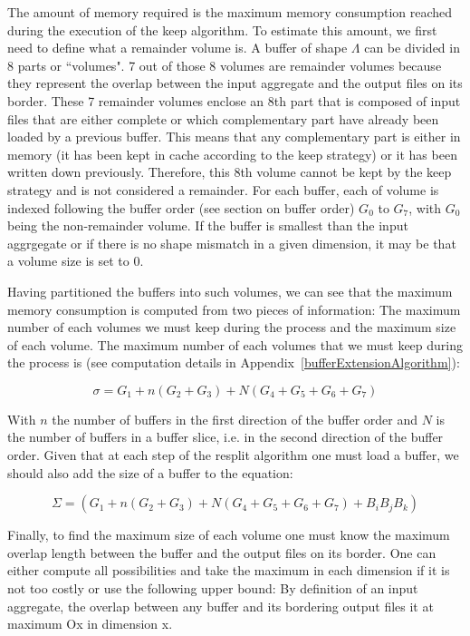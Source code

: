 \documentclass[conference]{IEEEtran}
\begin{document}
The amount of memory required is the maximum memory consumption reached during
the execution of the keep algorithm. To estimate this amount, we first need to
define what a remainder volume is. A buffer of shape $\Lambda$ can be divided in
8 parts or ``volumes". 7 out of those 8 volumes are remainder volumes because
they represent the overlap between the input aggregate and the output files on
its border. These 7 remainder volumes enclose an 8th part that is composed of
input files that are either complete or which complementary part have already
been loaded by a previous buffer. This means that any complementary part is either
in memory (it has been kept in cache according to the keep strategy) or it has
been written down previously. Therefore, this 8th volume cannot be kept by the
keep strategy and is not considered a remainder. For each buffer, each of volume
is indexed following the buffer order (see section on buffer order) $G_0$ to $G_7$, with
$G_0$ being the non-remainder volume. If the buffer is smallest than the input
aggrgegate or if there is no shape mismatch in a given dimension, it may be that
a volume size is set to 0.

Having partitioned the buffers into such volumes, we can see that the maximum
memory consumption is computed from two pieces of information: The maximum number
of each volumes we must keep during the process and the maximum size of each
volume. The maximum number of each volumes that we must keep during the process
is (see computation details in Appendix~\ref{bufferExtensionAlgorithm}):

\begin{equation} \label{eq:2}
\sigma = G_1 + n(G_2 + G_3) + N(G_4 + G_5 + G_6 + G_7)
\end{equation}

With $n$ the number of buffers in the first direction of the buffer order and
$N$ is the number of buffers in a buffer slice, i.e. in the second direction of
the buffer order. Given that at each step of the resplit algorithm one must
load a buffer, we should also add the size of a buffer to the equation:

\begin{equation} \label{eq:3}
\Sigma = (G_1 + n(G_2 + G_3) + N(G_4 + G_5 + G_6 + G_7) + B_iB_jB_k)
\end{equation}

Finally, to find the maximum size of each volume one must know the maximum
overlap length between the buffer and the output files on its border. One can
either compute all possibilities and take the maximum in each dimension if it is
not too costly or use the following upper bound: By definition of an input
aggregate, the overlap between any buffer and its bordering output files it at
maximum Ox in dimension x.
\end{document}
